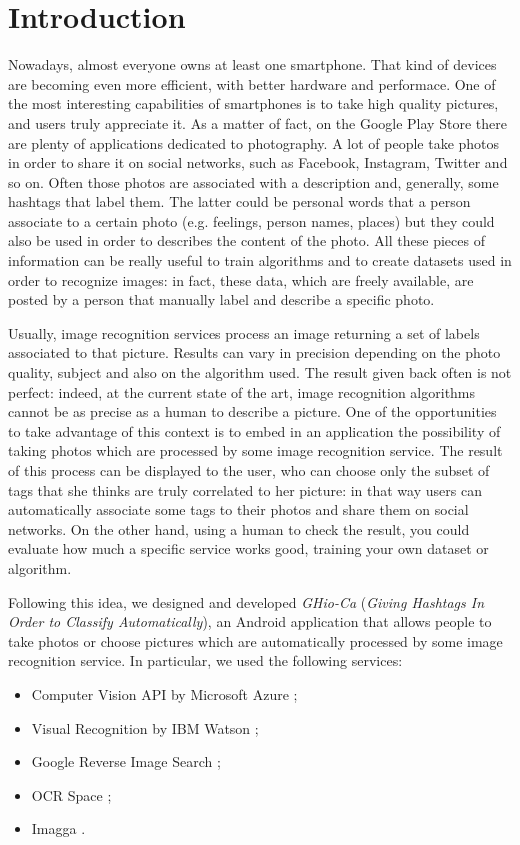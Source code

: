 \section{Introduction}
\label{sec:introduction}

Nowadays, almost everyone owns at least one smartphone. That kind of devices 
are becoming even more efficient, with better hardware and performace. One of 
the most interesting capabilities of smartphones is to take high quality 
pictures, and users truly appreciate it. As a matter of fact, on the Google Play 
Store there are plenty of applications dedicated to photography.
A lot of people take photos in order to share it on social networks, such as 
Facebook, Instagram, Twitter and so on. Often those photos are associated with 
a description and, generally, some hashtags that label them. The latter could 
be personal words that a person associate to a certain photo (e.g. feelings, 
person names, places) but they could also be used in order to describes the 
content of the photo.
All these pieces of information can be really useful to train algorithms and to 
create datasets used in order to recognize images: in fact, these data, which 
are freely available, are posted by a person that manually label and describe a 
specific photo.

Usually, image recognition services process an image returning a set of labels 
associated to that picture. Results can vary in precision depending on the photo 
quality, subject and also on the algorithm used. 
The result given back often is not perfect: indeed, at the current state of the 
art, image recognition algorithms cannot be as precise as a human to describe a 
picture.
One of the opportunities to take advantage of this context is to embed in an 
application the possibility of taking photos which are processed by some image 
recognition service. The result of this process can be displayed to the 
user, who can choose only the subset of tags that she thinks are truly 
correlated to her picture: in that way users can automatically associate some 
tags to their photos and share them on social networks. On the other hand, using 
a human to check the result, you could evaluate how much a specific service 
works good, training your own dataset or algorithm.

Following this idea, we designed and developed \textit{GHio-Ca} (\textit{Giving 
Hashtags In Order to Classify Automatically}), an Android application that 
allows people to take photos or choose pictures which are automatically 
processed by some image recognition service. In particular, we used the 
following services:
\begin{itemize}
  \item Computer Vision API by Microsoft Azure \cite{Microsoft};
  \item Visual Recognition by IBM Watson \cite{IBM};
  \item Google Reverse Image Search \cite{Google};
  \item OCR Space \cite{OCR};
  \item Imagga \cite{Imagga}.
\end{itemize}

